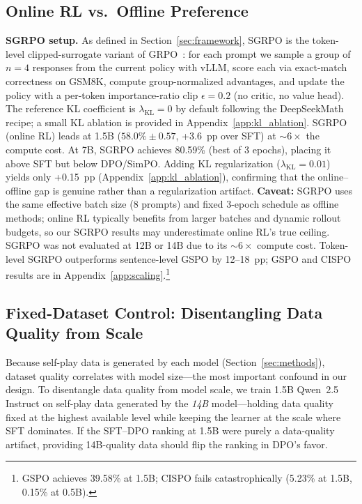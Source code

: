 \documentclass{article}
\begin{document}
\subsection{Online RL vs.\ Offline Preference}
\label{sec:online_vs_offline}

\textbf{SGRPO setup.} As defined in Section~\ref{sec:framework}, SGRPO is the token-level clipped-surrogate variant of GRPO~\citep{shao2024deepseekmath}: for each prompt we sample a group of $n{=}4$ responses from the current policy with vLLM, score each via exact-match correctness on GSM8K, compute group-normalized advantages, and update the policy with a per-token importance-ratio clip $\epsilon = 0.2$ (no critic, no value head). The reference KL coefficient is $\lambda_{\text{KL}} = 0$ by default following the DeepSeekMath recipe; a small KL ablation is provided in Appendix~\ref{app:kl_ablation}. SGRPO (online RL) leads at 1.5B ($58.0\% \pm 0.57$, +3.6~pp over SFT) at ${\sim}6\times$ the compute cost.
At 7B, SGRPO achieves 80.59\% (best of 3 epochs), placing it above SFT but below DPO/SimPO. Adding KL regularization ($\lambda_{\text{KL}} = 0.01$) yields only +0.15~pp (Appendix~\ref{app:kl_ablation}), confirming that the online--offline gap is genuine rather than a regularization artifact. \textbf{Caveat:} SGRPO uses the same effective batch size (8 prompts) and fixed 3-epoch schedule as offline methods; online RL typically benefits from larger batches and dynamic rollout budgets, so our SGRPO results may underestimate online RL's true ceiling. SGRPO was not evaluated at 12B or 14B due to its ${\sim}6\times$ compute cost. Token-level SGRPO outperforms sentence-level GSPO by 12--18~pp; GSPO and CISPO results are in Appendix~\ref{app:scaling}.\footnote{GSPO achieves 39.58\% at 1.5B; CISPO fails catastrophically (5.23\% at 1.5B, 0.15\% at 0.5B).}

\subsection{Fixed-Dataset Control: Disentangling Data Quality from Scale}
\label{sec:fixed_dataset}

Because self-play data is generated by each model (Section~\ref{sec:methods}), dataset quality correlates with model size---the most important confound in our design. To disentangle data quality from model scale, we train 1.5B Qwen~2.5 Instruct on self-play data generated by the \emph{14B} model---holding data quality fixed at the highest available level while keeping the learner at the scale where SFT dominates. If the SFT--DPO ranking at 1.5B were purely a data-quality artifact, providing 14B-quality data should flip the ranking in DPO's favor.
\end{document}

